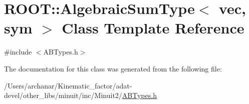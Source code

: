 \hypertarget{classROOT_1_1Minuit2_1_1AlgebraicSumType_3_01vec_00_01sym_01_4}{}\section{R\+O\+OT\+:\+:Algebraic\+Sum\+Type$<$ vec, sym $>$ Class Template Reference}
\label{classROOT_1_1Minuit2_1_1AlgebraicSumType_3_01vec_00_01sym_01_4}


{\ttfamily \#include $<$A\+B\+Types.\+h$>$}



The documentation for this class was generated from the following file\+:\begin{DoxyCompactItemize}
\item 
/\+Users/archanar/\+Kinematic\+\_\+factor/adat-\/devel/other\+\_\+libs/minuit/inc/\+Minuit2/\mbox{\hyperlink{adat-devel_2other__libs_2minuit_2inc_2Minuit2_2ABTypes_8h}{A\+B\+Types.\+h}}\end{DoxyCompactItemize}
